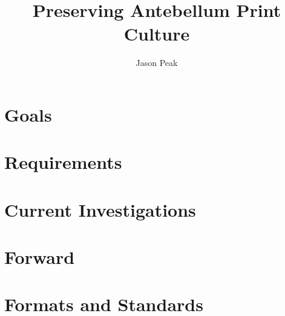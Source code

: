 \documentclass[oneside]{article}
\begin{document}
\title{Preserving Antebellum Print Culture}
\author{Jason Peak}


\def\projectname{Poe's Magazine World}
\def\apc{Antebellum Print Culture}
\def\bwj{\emph{The Broadway Journal}}
\def\slm{\emph{Southern Literary Messenger}}
\def\bgm{\emph{Burton's Gentleman's Magazine}}
\def\gm{\emph{Graham's Magazine}}
\def\maglist{\bgm, \bwj, \gm, and the \slm}

\def\needcite{[citation]}
\def\needswork{[needs much work for inclusion]}

%

%

%

\section{Goals}


\section{Requirements}


\section{Current Investigations}


\section{Forward}


\section{Formats and Standards}

\end{document}
